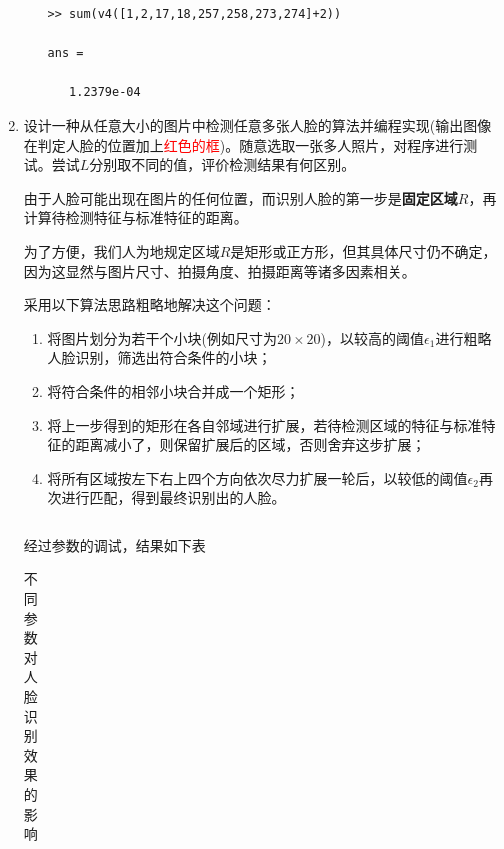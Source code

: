 \documentclass{article}
\numberwithin{figure}{section}
\numberwithin{table}{section}
\numberwithin{listing}{section}
\numberwithin{equation}{section}
\begin{document}
\begin{enumerate}
\begin{enumerate}
\begin{verbatim}
>> sum(v4([1,2,17,18,257,258,273,274]+2))

ans =

   1.2379e-04
                        \end{verbatim}

                \end{enumerate}

            \item 设计一种从任意大小的图片中检测任意多张人脸的算法并编程实现(输出图像在判定人脸的位置加上\textcolor{red}{红色的框})。随意选取一张多人照片，对程序进行测试。尝试$L$分别取不同的值，评价检测结果有何区别。

                由于人脸可能出现在图片的任何位置，而识别人脸的第一步是\textbf{固定区域}$R$，再计算待检测特征与标准特征的距离。

                为了方便，我们人为地规定区域$R$是矩形或正方形，但其具体尺寸仍不确定，因为这显然与图片尺寸、拍摄角度、拍摄距离等诸多因素相关。

                采用以下算法思路粗略地解决这个问题：

                \begin{enumerate}
                    \item 将图片划分为若干个小块(例如尺寸为$20\times 20$)，以较高的阈值$\epsilon_1$进行粗略人脸识别，筛选出符合条件的小块；
                    \item 将符合条件的相邻小块合并成一个矩形；
                    \item 将上一步得到的矩形在各自邻域进行扩展，若待检测区域的特征与标准特征的距离减小了，则保留扩展后的区域，否则舍弃这步扩展；
                    \item 将所有区域按左下右上四个方向依次尽力扩展一轮后，以较低的阈值$\epsilon_2$再次进行匹配，得到最终识别出的人脸。
                \end{enumerate}

                \inputminted{matlab}{../face_detect.m}
                \begingroup
                \endgroup

                经过参数的调试，结果如下表

                \begin{table}[H]
                    \caption{不同参数对人脸识别效果的影响}
                    \centering
                
                    \begin{tabular}{|c|c|c|c|c|c|c|}
                    \hline
                

\end{tabular}
\end{table}
\end{enumerate}
\end{document}
